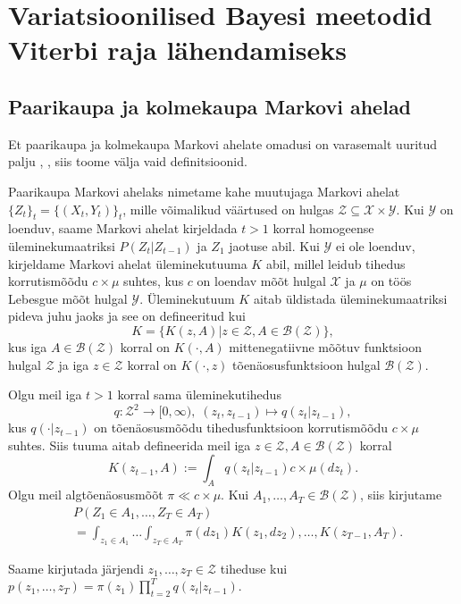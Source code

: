 \section{Variatsioonilised Bayesi meetodid Viterbi raja lähendamiseks}

\subsection{Paarikaupa ja kolmekaupa Markovi ahelad}

Et paarikaupa ja kolmekaupa Markovi ahelate omadusi on varasemalt uuritud palju \parencite{Soop.2023}, \parencite{Avans.2021}, siis toome välja vaid definitsioonid.

Paarikaupa Markovi ahelaks nimetame kahe muutujaga Markovi ahelat $\{Z_t\}_{t} = \{(X_t,Y_t)\}_{t}$, mille võimalikud väärtused on hulgas $\mathcal{Z} \subseteq \mathcal{X} \times \mathcal{Y}$. Kui $\mathcal{Y}$ on loenduv, saame Markovi ahelat kirjeldada $t>1$ korral homogeense üleminekumaatriksi $P(Z_t|Z_{t-1})$ ja $Z_1$ jaotuse abil. Kui $\mathcal{Y}$ ei ole loenduv, kirjeldame Markovi ahelat üleminekutuuma $K$ abil, millel leidub tihedus korrutismõõdu $c \times \mu$ suhtes, kus $c$ on loendav mõõt hulgal $\mathcal{X}$ ja $\mu$ on töös Lebesgue mõõt hulgal $\mathcal{Y}$. Üleminekutuum $K$ aitab üldistada üleminekumaatriksi pideva juhu jaoks ja see on defineeritud kui
$$K = \{ K(z,A) | z \in \mathcal{Z}, A \in \mathcal{B}(\mathcal{Z}) \},$$
kus iga $A \in \mathcal{B}(\mathcal{Z})$ korral on $K(\cdot, A)$ mittenegatiivne mõõtuv funktsioon hulgal $\mathcal{Z}$ ja iga $z \in \mathcal{Z}$ korral on $K(\cdot, z)$ tõenäosusfunktsioon hulgal $\mathcal{B}(\mathcal{Z})$. 

Olgu meil iga $t>1$ korral sama üleminekutihedus
$$q: \mathcal{Z}^2 \rightarrow [0,\infty),\; (z_t,z_{t-1}) \mapsto q(z_t|z_{t-1}),$$
kus $q(\cdot|z_{t-1})$ on tõenäosusmõõdu tihedusfunktsioon korrutismõõdu $c \times \mu$ suhtes. Siis tuuma aitab defineerida meil iga $z \in \mathcal{Z}, A \in \mathcal{B}(\mathcal{Z})$ korral 
$$K(z_{t-1},A) := \int_A q(z_t|z_{t-1}) c \times \mu (dz_t).$$ 
Olgu meil algtõenäosusmõõt $\pi \ll c \times \mu$. Kui $A_1,\ldots,A_T \in \mathcal{B}(\mathcal{Z})$, siis kirjutame 
\begin{align*}
    &P(Z_1 \in A_1,\ldots,Z_T \in A_T)\\
    &= \int_{z_1 \in A_1} \ldots \int_{z_{T} \in A_{T}} \pi(dz_1) K(z_1, dz_2),\ldots,K(z_{T-1},A_T).
\end{align*}

Saame kirjutada järjendi $z_1,\ldots,z_T \in \mathcal{Z}$ tiheduse kui
$p(z_1,\ldots,z_T) = \pi(z_1)\prod_{t=2}^Tq(z_t|z_{t-1}).$

